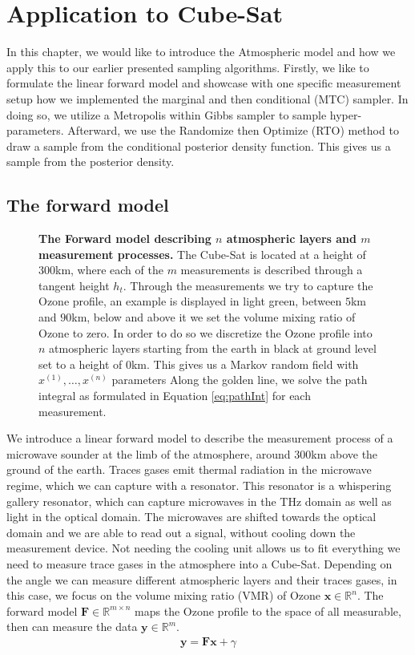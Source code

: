 \chapter{Application to Cube-Sat}
\label{ch:3-application}
In this chapter, we would like to introduce the Atmospheric model and how we apply this to our earlier presented sampling algorithms.
Firstly, we like to formulate the linear forward model and showcase with one specific measurement setup how we implemented the marginal and then conditional (MTC) sampler.
In doing so, we utilize a Metropolis within Gibbs sampler to sample hyper-parameters.
Afterward, we use the Randomize then Optimize (RTO) method to draw a sample from the conditional posterior density function.
This gives us a sample from the  posterior density.

\section{The forward model}
\label{subsec:atmosModel}
\begin{figure}[thb!]
\centering 
\caption[The Forward model describing $n$ atmospheric layers and $m$ measurement processes.]{\textbf{The Forward model describing $n$ atmospheric layers and $m$ measurement processes.} The Cube-Sat is located at a height of $300$km, where each of the $m$ measurements is described through a tangent height $h_t$. Through the measurements we try to capture the Ozone profile, an example is displayed in light green, between $5$km and $90$km, below and above it we set the volume mixing ratio of Ozone to zero.
In order to do so we discretize the Ozone profile into $n$ atmospheric layers starting from the earth in black at ground level set to a height of $0$km.
This gives us a Markov random field with $x^{(1)}, \dots, x^{(n)}$ parameters
Along the golden line, we solve the path integral as formulated in Equation \ref{eq:pathInt} for each measurement.}
\label{fig:forModel}
\end{figure}

We introduce a linear forward model to describe the measurement process of a microwave sounder at the limb of the atmosphere, around $300$km above the ground of the earth.
Traces gases emit thermal radiation in the microwave regime, which we can capture with a resonator.
This resonator is a whispering gallery resonator, which can capture microwaves in the THz domain as well as light in the optical domain.
The microwaves are shifted towards the optical domain and we are able to read out a signal, without cooling down the measurement device.
Not needing the cooling unit allows us to fit everything we need to measure trace gases in the atmosphere into a Cube-Sat.
Depending on the angle we can measure different atmospheric layers and their traces gases, in this case, we focus on the volume mixing ratio (VMR) of Ozone $\bm{x} \in \mathbb{R}^n$.
The forward model $ \bm{F} \in \mathbb{R}^{m \times n}$  maps the Ozone profile to the space of all measurable, then can measure the data $\bm{y} \in \mathbb{R}^m$.
\begin{align}
   \bm{y} =  \bm{F}  \bm{x} + \gamma
\end{align} 

